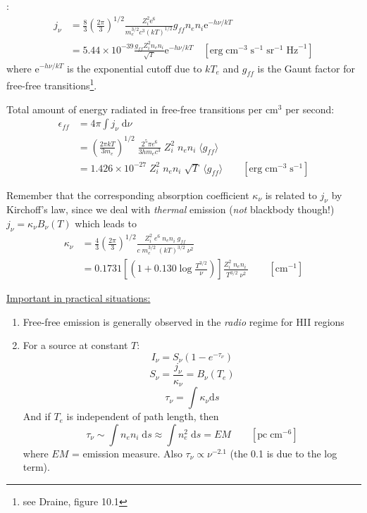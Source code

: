 \documentclass[11pt]{article}
\newcommand{\mar}[1]{\hspace{0pt}\marginpar{-\textcolor{black}{#1}-}}
\begin{document}
\underline{}:
\begin{align*}
    j_{\nu} &= \frac{8}{3}\left(\frac{2\pi}{3}\right)^{1/2}
    \frac{Z_{i}^{2}\mathrm{e}^{6}}{m_{e}^{3/2}c^{3}(kT)^{1/2}}
    g_{ff}n_{e}n_{i}\mathrm{e}^{-h\nu/kT}\\
    &= 5.44\times10^{-39}\frac{g_{ff}Z_{i}^{2}n_{e}n_{i}}{\sqrt{T}}
    \mathrm{e}^{-h\nu/kT}\quad
    [\mathrm{erg}\;\mathrm{cm}^{-3}\;\mathrm{s}^{-1}\;\mathrm{sr}^{-1}\;\mathrm{Hz}^{-1}]
\end{align*}
where $\mathrm{e}^{-h\nu/kT}$ is the exponential cutoff due to $kT_{e}$
and $g_{ff}$ is the Gaunt factor for free-free transitions\footnote{see
Draine, figure 10.1}.

Total amount of energy radiated in free-free transitions per cm$^{3}$
per second:
\begin{align*}
    \epsilon_{ff} &= 4\pi \int{ j_{\nu} \;\mathrm{d}\nu }
    \\&= \left( \frac{2{\pi}kT}{3m_{e}} \right)^{1/2}\;
    \frac{2^{5} \pi e^{6}}{3hm_{e}c^{3}}\;
    Z_{i}^{2}\; n_{e}n_{i}\; \langle g_{ff} \rangle
    \\&= 1.426 \times 10^{-27}\; Z_{i}^{2}\; n_{e}n_{i}\; \sqrt{T}\;
    \langle g_{ff} \rangle
    \qquad \left[ \mathrm{erg}\; \mathrm{cm}^{-3}\; \mathrm{s}^{-1} \right]
\end{align*}

Remember that the corresponding absorption coefficient $\kappa_{\nu}$ is
related to $j_{\nu}$ by Kirchoff's law, since we deal with \emph{thermal}
emission (\emph{not} blackbody though!) $j_{\nu} = \kappa_{\nu}B_{\nu}(T)$
which leads to
\begin{align*}
    \kappa_{\nu} &= \frac{4}{3} \left( \frac{2\pi}{3} \right)^{1/2}
    \frac{ Z_{i}^{2}\; e^{6}\; n_{e}n_{i}\; g_{ff} }{ c\; m_{e}^{3/2}\; (kT)^{3/2}\; \nu^{2} }
    \\&= 0.1731 \left[ \left( 1 + 0.130 \log{\frac{T^{3/2}}{\nu}} \right) \right]
    \frac{ Z_{i}^{2}\; n_{e}n_{i}\; }{ T^{3/2}\; \nu^{2} }
    \qquad \left[ \mathrm{cm}^{-1} \right]
\end{align*}

\mar{65}\underline{Important in practical situations:}
\begin{enumerate}
    \item Free-free emission is generally observed in the \emph{radio} regime
        for HII regions
    \item For a source at constant $T$:
        \[
            I_{\nu} = S_{\nu} \left( 1 - e^{-\tau_{\nu}} \right)
            \]
        \[
            S_{\nu} = \frac{j_{\nu}}{\kappa_{\nu}} = B_{\nu} (T_{e})
            \]
        \[
            \tau_{\nu} = \int \kappa_{\nu} \mathrm{d}s
            \]
        And if $T_{e}$ is independent of path length, then
        \[
            \tau_{\nu}
            \sim \int{\! n_{e}n_{i} \;\mathrm{d}s }
            \approx \int{\! n_{e}^{2} \;\mathrm{d}s }
            = EM \qquad \left[ \mathrm{pc}\; \mathrm{cm}^{-6} \right]
            \]
        where $EM$ = emission measure.
        Also $\tau_{\nu} \propto \nu^{-2.1} $ (the 0.1 is due to the log term).
\end{enumerate}
\end{document}
